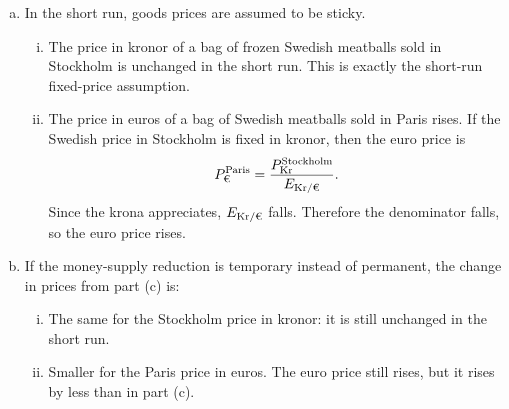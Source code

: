 \documentclass[11pt]{article}
\newenvironment{problem}[2][Problem]{\begin{trivlist}
\item[\hskip \labelsep {\bfseries #1}\hskip \labelsep {\bfseries #2.}]
\leavevmode\par
}{\end{trivlist}}
\newcommand{\Ekr}{E_{\text{Kr}/\text{\texteuro}}}
\begin{document}
\begin{problem}{1}
\begin{enumerate}[(a)]
\begin{center}
\end{center}

So, in the short run,
\[
Y_{\text{Kr}} \downarrow,
\qquad
\Ekr \downarrow.
\]
Swedish output falls, and the krona appreciates.

\item In the short run, goods prices are assumed to be sticky.

\begin{enumerate}[(i)]
\item The price in kronor of a bag of frozen Swedish meatballs sold in Stockholm is unchanged in the short run. This is exactly the short-run fixed-price assumption.

\item The price in euros of a bag of Swedish meatballs sold in Paris rises. If the Swedish price in Stockholm is fixed in kronor, then the euro price is
\[
P_{\text{\texteuro}}^{\text{Paris}}
=
\frac{P_{\text{Kr}}^{\text{Stockholm}}}{\Ekr}.
\]
Since the krona appreciates, \(\Ekr\) falls. Therefore the denominator falls, so the euro price rises.
\end{enumerate}

\item If the money-supply reduction is temporary instead of permanent, the change in prices from part (c) is:

\begin{enumerate}[(i)]
\item The same for the Stockholm price in kronor: it is still unchanged in the short run.

\item Smaller for the Paris price in euros. The euro price still rises, but it rises by less than in part (c).
\end{enumerate}


\end{enumerate}
\end{problem}
\end{document}
